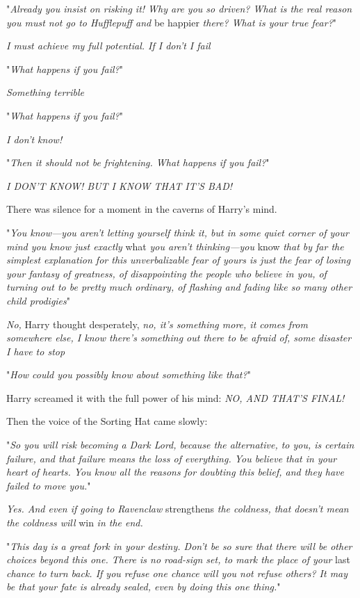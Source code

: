 "\emph{Already you insist on risking it! Why are you so driven? What is the
real reason you must not go to Hufflepuff and} be happier \emph{there? What is
your true fear?}"

\emph{I must achieve my full potential. If I don't I{\el} fail{\el}}

"\emph{What happens if you fail?}"

\emph{Something terrible{\el}}

"\emph{What happens if you fail?}"

\emph{I don't know!}

"\emph{Then it should not be frightening. What happens if you fail?}"

\emph{I DON'T KNOW! BUT I KNOW THAT IT'S BAD!}

There was silence for a moment in the caverns of Harry's mind.

"\emph{You know---you aren't letting yourself think it, but in some quiet
corner of your mind you know just exactly} what \emph{you aren't
thinking---you} know \emph{that by far the simplest explanation for this
unverbalizable fear of yours is just the fear of losing your fantasy of
greatness, of disappointing the people who believe in you, of turning out to be
pretty much ordinary, of flashing and fading like so many other child
prodigies{\el}}"

\emph{No,} Harry thought desperately, \emph{no, it's something more, it comes
from somewhere else, I know there's something out there to be afraid of, some
disaster I have to stop{\el}}

"\emph{How could you possibly know about something like that?}"

Harry screamed it with the full power of his mind: \emph{NO, AND THAT'S FINAL!}

Then the voice of the Sorting Hat came slowly:

"\emph{So you will risk becoming a Dark Lord, because the alternative, to you,
is certain failure, and that failure means the loss of everything. You believe
that in your heart of hearts. You know all the reasons for doubting this
belief, and they have failed to move you.}"

\emph{Yes. And even if going to Ravenclaw} strengthens \emph{the coldness, that
doesn't mean the coldness will} win \emph{in the end.}

"\emph{This day is a great fork in your destiny. Don't be so sure that there
will be other choices beyond this one. There is no road-sign set, to mark the
place of your} last \emph{chance to turn back. If you refuse one chance will
you not refuse others? It may be that your fate is already sealed, even by
doing this one thing.}"

